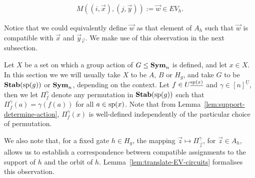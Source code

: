 \documentclass[../paper.tex]{subfiles}
\begin{document}
\begin{align*}
	M((i , \vec{x}), (j, \vec{y})) := \vec{w} \in EV_h. 
\end{align*}

Notice that we could equivalently define $\vec{w}$ as that element of $A_h$ such
that $\vec{w}$ is compatible with $\vec{x}$ and $\vec{y}_{\vec{c}}$. We make use
of this observation in the next subsection.




Let $X$ be a set on which a group action of $G \leq \text{\textbf{Sym}}_n$ is defined, and let
$x \in X$. In this section we we will usually take $X$ to be $A$, $B$ or $H_g$,
and take $G$ to be $\text{\textbf{Stab}} (\text{sp} (g))$ or $\text{\textbf{Sym}}_n$, depending on the context. Let $f
\in U^{\underline{\text{sp}(x)}}$ and $\gamma \in [n]^{\underline{U}}$, then we let
$\Pi^{\gamma}_{f}$ denote any permutation in $\text{\textbf{Stab}} (\text{sp} (g))$ such that
$\Pi^{\gamma}_f (a) = \gamma (f(a))$ for all $a \in \text{sp}(x)$. Note that from
Lemma~\ref{lem:support-determine-action}, $\Pi^{\gamma}_f(x)$ is well-defined
independently of the particular choice of permutation.

We also note that, for a fixed gate $h \in H_g$, the mapping $\vec{z} \mapsto
\Pi^{\gamma}_{\vec{z}}$, for $\vec{z} \in A_h$, allows us to establish a
correspondence between compatible assignments to the support of $h$ and the
orbit of $h$. Lemma~\ref{lem:translate-EV-circuits} formalises this observation.
\end{document}
